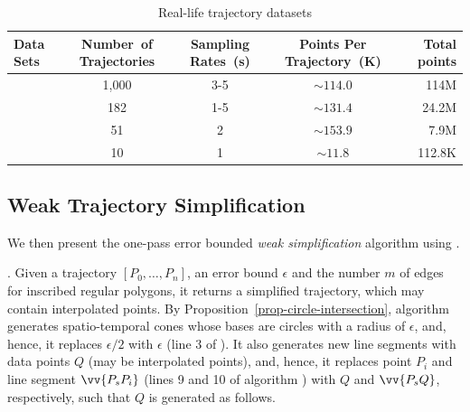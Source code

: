 \begin{table}[bt!]
	\vspace{-1ex}
	\caption{\small Real-life trajectory datasets}
	\centering
	\small
	\begin{tabular}{|l|c|c|c|r|}
		\hline
		\bf{ Data Sets}& \bf{Number\ of Trajectories}     &\bf {Sampling Rates\ (s)}   &\bf{Points Per Trajectory\ (K)}    &\bf {Total points} \\
		\hline
		\sercar	&1,000	    &3-5	    &$\sim114.0$   &114M\\
		\hline
		\geolife &182	    &1-5	    &$\sim131.4$   &24.2M\\
		\hline
		\mopsi	&51	    	&2	    &$\sim153.9$     &7.9M\\
		\hline
		\pricar	& 10	    &1	        &$\sim11.8$      &112.8K \\
		\hline
	\end{tabular}
	\label{tab:datasets}
\end{table}

\subsection{Weak Trajectory Simplification}

We then present the one-pass error bounded {\em weak simplification} algorithm using \sed.



.
Given a trajectory ${[P_0, \ldots, P_n]}$, an error bound $\epsilon$ and the number $m$ of edges for inscribed
regular polygons, it returns a simplified trajectory,
which may contain interpolated points.
%
By Proposition~\ref{prop-circle-intersection}, algorithm \cista generates spatio-temporal cones whose bases are circles with a radius of $\epsilon$,
and, hence, it replaces $\epsilon/2$ with $\epsilon$ (line 3 of \cist). It also generates new line segments with data points $Q$ (may be interpolated points), and,
hence, it replaces point $P_i$ and line segment $\vv{P_sP_i}$  (lines 9 and 10 of algorithm \cist) with $Q$ and $\vv{P_sQ}$, respectively,  such that $Q$ is generated as follows.


